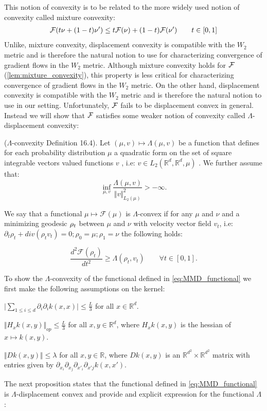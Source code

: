 This notion of convexity is to be related to the more widely used notion of convexity called mixture convexity:
\begin{align}
	{{\mathcal F}}(t\nu +(1-t)\nu')\leq t{{\mathcal F}}(\nu)+(1-t){{\mathcal F}}(\nu') \qquad t\in [0,1]
\end{align}
Unlike, mixture convexity, displacement convexity is compatible with the $W_2$ metric and is therefore the natural notion to use for characterizing convergence of gradient flows in the $W_2$ metric.
Although mixture convexity holds for ${{\mathcal F}}$ (\cref{lem:mixture_convexity}), this property is less critical for characterizing convergence of gradient flows in the $W_2$ metric. On the other hand, displacement convexity is compatible with the $W_2$ metric \cite{Bottou:2017} and is therefore the natural notion to use in our setting. Unfortunately, ${{\mathcal F}}$ fails to be displacement convex in general. Instead we will show that ${{\mathcal F}}$ satisfies some weaker notion of convexity called $\Lambda$-displacement convexity:
%
\begin{definition}\label{def:lambda-convexity}
($\Lambda$-convexity \cite{Villani:2009} Definition 16.4). Let $(\mu,v)\mapsto\Lambda(\mu,v)$
be a function that defines for each probability distribution $\mu$
a quadratic form on the set of square integrable vectors valued functions
$v$ , i.e: $v\in L_{2}(\mathbb{R}^{d},\mathbb{R}^{d},\mu)$ . We
further assume that:
\[
\inf_{\mu,v}\frac{\Lambda(\mu,v)}{\Vert v\Vert_{L_{2}(\mu)}^{2}}>-\infty.
\]

We say that a functional $\mu\mapsto\mathcal{F}(\mu)$ is $\Lambda$-convex
if for any $\mu$ and $\nu$ and a minimizing geodesic $\text{\ensuremath{\rho_{t}}}$
between $\mu$ and $\nu$ with velocity vector field $v_{t}$, i.e:
$\partial_{t}\rho_{t}+div(\rho_{t}v_{t})=0;\rho_{0}=\mu;\rho_{1}=\nu$
the following holds:
\end{definition}
\begin{equation*}
\frac{d^{2}\mathcal{F}(\rho_{t})}{dt^{2}}\geq\Lambda(\rho_{t},v_{t})\qquad\forall t\in[0,1].
\end{equation*}

To show the $\Lambda$-convexity of the functional defined in \cref{eq:MMD_functional} we first make the following assumptions on the kernel:
\begin{assumplist} 
\item \label{assump:bounded_trace} $ \vert \sum_{1\leq i\leq d} \partial_i\partial_ik(x,x) \vert\leq \frac{L}{3}  $ for all $x\in \mathbb{R}^d$.
\item \label{assump:bounded_hessian} $\Vert H_xk(x,y) \Vert_{op} \leq \frac{L}{3}$ for all $x,y\in \mathbb{R}^d$, where $H_xk(x,y)$ is the hessian of $x\mapsto k(x,y)$.
\item \label{assump:bounded_fourth_oder} $\Vert Dk(x,y) \Vert\leq \lambda  $ for all $x,y\in \mathbb{R}$, where $Dk(x,y)$ is an $\mathbb{R}^{d^2}\times \mathbb{R}^{d^2}$ matrix with entries given by $\partial_{x_{i}}\partial_{x_{j}}\partial_{x'_{i}}\partial_{x'j}k(x,x')$.
\end{assumplist}
The next proposition states that the functional defined in \cref{eq:MMD_functional} is $\Lambda$-displacement convex and provide and explicit expression for the functional $\Lambda$:

